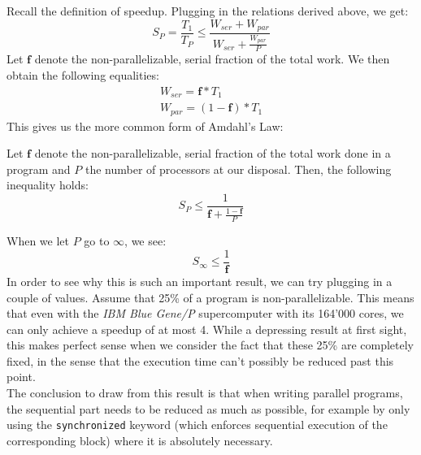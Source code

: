 \documentclass[main.tex]{subfiles}
\begin{document}
\noindent Recall the definition of speedup. Plugging in the relations derived above, we get:
\begin{equation*}
    S_P = \frac{T_1}{T_P} \leq \frac{W_{ser} + W_{par}}{W_{ser} + \frac{W_{par}}{P}}
\end{equation*}
Let $\mathbf{f}$ denote the non-parallelizable, serial fraction of the total work. We then obtain the following equalities:
\begin{gather*}
    W_{ser} = \mathbf{f}*T_1 \\
    W_{par} = (1-\mathbf{f})*T_1
\end{gather*}
This gives us the more common form of Amdahl's Law:
\begin{theorem}
    Let $\mathbf{f}$ denote the non-parallelizable, serial fraction of the total work done in a program and $P$ the number of processors at our disposal. Then, the following inequality holds:
    \begin{equation*}
        S_P \leq \frac{1}{\mathbf{f} + \frac{1-\mathbf{f}}{P}}
    \end{equation*}
\end{theorem}
When we let $P$ go to $\infty$, we see:
\begin{equation*}
    S_\infty \leq \frac{1}{\mathbf{f}}
\end{equation*}
In order to see why this is such an important result, we can try plugging in a couple of values. Assume that 25\% of a program is non-parallelizable. This means that even with the \textit{IBM Blue Gene/P} supercomputer with its 164'000 cores, we can only achieve a speedup of at most 4. While a depressing result at first sight, this makes perfect sense when we consider the fact that these 25\% are completely fixed, in the sense that the execution time can't possibly be reduced past this point.\\[0.3cm]
The conclusion to draw from this result is that when writing parallel programs, the sequential part needs to be reduced as much as possible, for example by only using the \texttt{synchronized} keyword (which enforces sequential execution of the corresponding block) where it is absolutely necessary.

\end{document}

